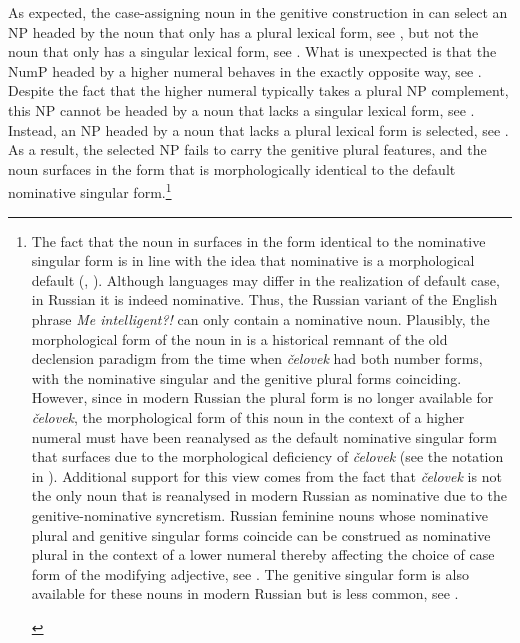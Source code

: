 \documentclass[output=paper,
modfonts,
newtxmath,
hidelinks
]{langscibook}
\begin{document}
As expected, the case-assigning noun in the genitive construction in  can select an NP headed by the noun that only has a plural lexical form, see , but not the noun that only has a singular lexical form, see . What is unexpected is that the NumP headed by a higher numeral behaves in the exactly opposite way, see . Despite the fact that the higher numeral typically takes a plural NP complement, this NP cannot be headed by a noun that lacks a singular lexical form, see . Instead, an NP headed by a noun that lacks a plural lexical form is selected, see . As a result, the selected NP fails to carry the genitive plural features, and the noun surfaces in the form that is morphologically identical to the default nominative singular form.\footnote{\label{fn3}The fact that the noun in  surfaces in the form identical to the nominative singular form is in line with the idea that nominative is a morphological default (\citealt{Marantz1991}, \citealt{Schütze1997, Schütze2001}). Although languages may differ in the realization of default case, in Russian it is indeed nominative. Thus, the Russian variant of the English phrase \textit{Me intelligent?!} can only contain a nominative noun. Plausibly, the morphological form of the noun in  is a historical remnant of the old declension paradigm from the time when \textit{čelovek} had both number forms, with the nominative singular and the genitive plural forms coinciding. However, since in modern Russian the plural form is no longer available for \textit{čelovek}, the morphological form of this noun in the context of a higher numeral must have been reanalysed as the default nominative singular form that surfaces due to the morphological deficiency of \textit{čelovek} (see the notation in ).   Additional support for this view comes from the fact that \textit{čelovek} is not the only noun that is reanalysed in modern Russian as nominative due to the genitive-nominative syncretism. Russian feminine nouns whose nominative plural and genitive singular forms coincide can be construed as nominative plural in the context of a lower numeral thereby affecting the choice of case form of the modifying adjective, see . The genitive singular form is also available for these nouns in modern Russian but is less common, see .

\begin{multicols}{2}
\ea \label{fn3i1}
	\label{fn3i}\columnbreak
    \label{fn3ii}
    \z
\z
\end{multicols}

}
\end{document}
